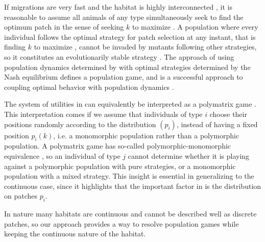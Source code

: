 If migrations are very fast and the habitat is highly interconnected \citep{abrams2007role, cressman2006migration}, it is reasonable to assume all animals of any type simultaneously seek to find the optimum patch in the sense of seeking $k$ to maximize . A population where every individual follows the optimal strategy for patch selection at any instant, that is finding $k$ to maximize , cannot be invaded by mutants following other strategies, so it constitutes an evolutionarily stable strategy \citep{kvrivan2009evolutionary}. The approach of using population dynamics determined by  with optimal strategies determined by the Nash equilibrium defines a population game, and is a successful approach to coupling optimal behavior with population dynamics \citep{valdovinos2010consequences, mougi2019adaptive, pinti2021co}.



The system of utilities in  can equivalently be interpreted as a polymatrix game \citep{howson1972equilibria}. This interpretation comes if we assume that individuals of type $i$ choose their positions randomly according to the distribution $(p_i)$, instead of having a fixed position $p_i(k)$, i.e. a monomorphic population rather than a polymorphic population. A polymatrix game has so-called polymorphic-monomorphic equivalence \citep{broom2013game}, so an individual of type $j$ cannot determine whether it is playing against a polymorphic population with pure strategies, or a monomorphic population with a mixed strategy. This insight is essential in generalizing to the continuous case, since it highlights that the important factor in  is the distribution on patches $p_i$.

In nature many habitats are continuous and cannot be described well as discrete patches, so our approach provides a way to resolve population games while keeping the continuous nature of the habitat.

